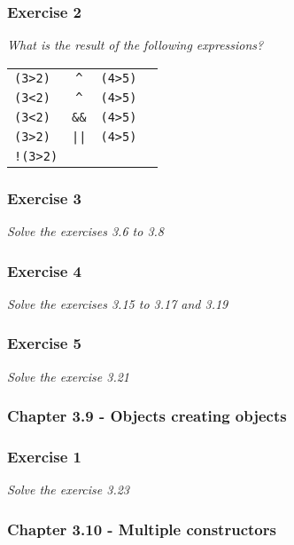 \subsubsection*{Exercise 2}
\textit{What is the result of the following expressions?}\\

\begin{table}[h!]
	\begin{tabular}{l c l l}
	\lstinline!(3>2)! & \lstinline!^! & \lstinline!(4>5)! & \\
	\lstinline!(3<2)! & \lstinline!^! & \lstinline!(4>5)! & \\
	\lstinline!(3<2)! & \lstinline!&&! & \lstinline!(4>5)! &  \\
	\lstinline!(3>2)! & \lstinline!||! & \lstinline!(4>5)! & \\
	\lstinline?!(3>2)? &  &  &
	\end{tabular}
\end{table}

\subsubsection*{Exercise 3}
\textit{Solve the exercises 3.6 to 3.8}\\


\subsubsection*{Exercise 4}
\textit{Solve the exercises 3.15 to 3.17 and 3.19}\\


\subsubsection*{Exercise 5}
\textit{Solve the exercise 3.21}\\

\subsubsection{Chapter 3.9 - Objects creating objects}

\subsubsection*{Exercise 1}
\textit{Solve the exercise 3.23}\\

\subsubsection{Chapter 3.10 - Multiple constructors}

